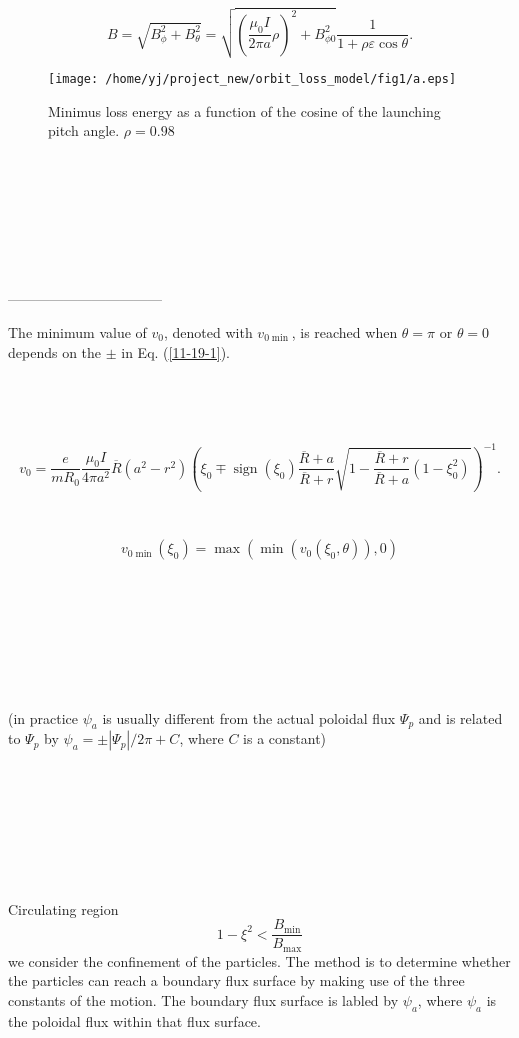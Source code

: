 \documentclass{article}
\newcommand{\tmop}[1]{\ensuremath{\operatorname{#1}}}
\begin{document}
\begin{equation}
  B = \sqrt{B_{\phi}^2 + B_{\theta}^2} = \sqrt{\left( \frac{\mu_0 I}{2 \pi a}
  \rho \right)^2 + B_{\phi 0}^2} \frac{1}{1 + \rho \varepsilon \cos \theta} .
\end{equation}


\begin{figure}[h]
  \texttt{[image: /home/yj/project\_new/orbit\_loss\_model/fig1/a.eps]}
  \caption{Minimus loss energy as a function of the cosine of the launching
  pitch angle. $\rho = 0.98$}
\end{figure}

\

\

\

\

---------------------------------

The minimum value of $v_0$, denoted with $v_{0 \min}$, is reached when $\theta
= \pi$ or $\theta = 0$ depends on the $\pm$ in Eq. (\ref{11-19-1}).

\

\


\begin{equation}
  v_0 = \frac{e}{m R_0}  \frac{\mu_0 I}{4 \pi a^2} \overline{R} (a^2 - r^2)
  \left( \xi_0 \mp \tmop{sign} (\xi_0) \frac{\overline{R} + a}{\overline{R} +
  r} \sqrt{1 - \frac{\overline{R} + r}{\overline{R} + a} (1 - \xi_0^2)}
  \right)^{- 1} .
\end{equation}


\


\begin{equation}
  v_{0 \min} (\xi_0) = \max (\min (v_0 (\xi_0, \theta)), 0)
\end{equation}


\

\

\

\

(in practice $\psi_a$ is usually different from the actual poloidal flux
$\Psi_p$ and is related to $\Psi_p$ by $\psi_a = \pm | \Psi_p | / 2 \pi + C$,
where $C$ is a constant)

\

\

\

\

Circulating region
\begin{equation}
  1 - \xi^2 < \frac{B_{\min}}{B_{\max}}
\end{equation}
we consider the confinement of the particles. The method is to determine
whether the particles can reach a boundary flux surface by making use of the
three constants of the motion. The boundary flux surface is labled by
$\psi_a$, where $\psi_a$ is the poloidal flux within that flux surface.
\end{document}
